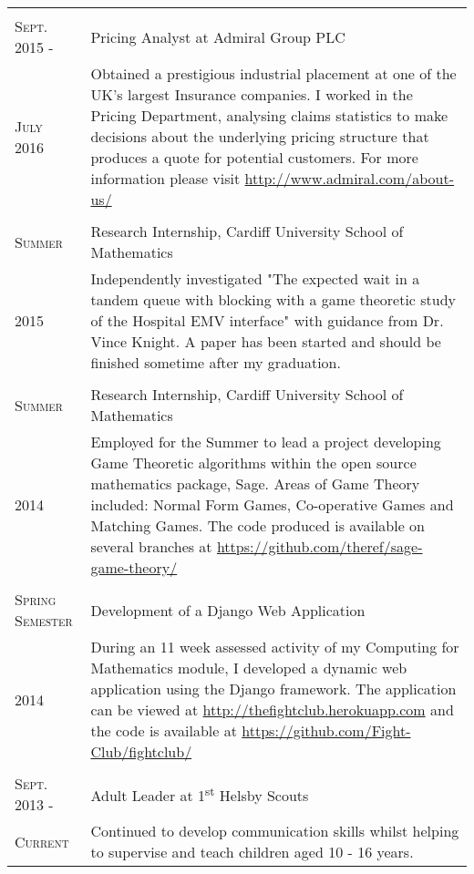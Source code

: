 \documentclass[a4paper]{article}
\begin{document}
\begin{tabularx}{\textwidth}{lX}
\\
\\
\textsc{Sept. 2015 -} & Pricing Analyst at Admiral Group PLC \\
\textsc{July 2016} & \footnotesize{Obtained a prestigious industrial placement at one of the UK's largest Insurance companies. I worked in the Pricing Department, analysing claims statistics to make decisions about the underlying pricing structure that produces a quote for potential customers. For more information please visit \url{http://www.admiral.com/about-us/}}
\\
\\
\textsc{Summer} & Research Internship, Cardiff University School of Mathematics \\
\textsc{2015} & \footnotesize{Independently investigated "The expected wait in a tandem queue with blocking with a game theoretic study of the Hospital EMV interface" with guidance from Dr. Vince Knight. A paper has been started and should be finished sometime after my graduation.}
\\
\\
\textsc{Summer} & Research Internship, Cardiff University School of Mathematics \\
\textsc{2014} & \footnotesize{Employed for the Summer to lead a project developing Game Theoretic algorithms within the open source mathematics package, Sage.
Areas of Game Theory included: Normal Form Games, Co-operative Games and Matching Games. The code produced is available on several branches at \url{https://github.com/theref/sage-game-theory/}}
\\
\\
\textsc{Spring Semester} & Development of a Django Web Application\\
\textsc{2014} & \footnotesize{During an 11 week assessed activity of my Computing for Mathematics module, I developed a dynamic web application using the Django framework. The application can be viewed at \url{http://thefightclub.herokuapp.com} and the code is available at \url{https://github.com/Fight-Club/fightclub/}}
\\
\\
\textsc{Sept. 2013 -} & Adult Leader at 1\textsuperscript{st} Helsby Scouts\\
\textsc{Current} & \footnotesize{Continued to develop communication skills whilst helping to supervise and teach children aged 10 - 16 years.
}
\end{tabularx}
\end{document}
